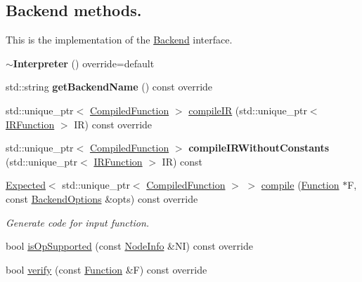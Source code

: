 \subsection*{Backend methods.}
\label{_amgrp74a5605ee0c2530d0af87631bd615b01}%
 This is the implementation of the \hyperlink{classglow_1_1_backend}{Backend} interface. \begin{DoxyCompactItemize}
\item 
\mbox{\label{classglow_1_1_interpreter_a411faff129fc4eb700f1dfd834839e11}} 
{\bfseries $\sim$\+Interpreter} () override=default
\item 
\mbox{\label{classglow_1_1_interpreter_a3232216f9576c8085d334fc356193184}} 
std\+::string {\bfseries get\+Backend\+Name} () const override
\item 
std\+::unique\+\_\+ptr$<$ \hyperlink{classglow_1_1_compiled_function}{Compiled\+Function} $>$ \hyperlink{classglow_1_1_interpreter_a24793ffaf0f6a80a2983dcb117719659}{compile\+IR} (std\+::unique\+\_\+ptr$<$ \hyperlink{classglow_1_1_i_r_function}{I\+R\+Function} $>$ IR) const override
\item 
\mbox{\label{classglow_1_1_interpreter_ade5bdc8e683c53c6a1cebf3959a673e3}} 
std\+::unique\+\_\+ptr$<$ \hyperlink{classglow_1_1_compiled_function}{Compiled\+Function} $>$ {\bfseries compile\+I\+R\+Without\+Constants} (std\+::unique\+\_\+ptr$<$ \hyperlink{classglow_1_1_i_r_function}{I\+R\+Function} $>$ IR) const
\item 
\hyperlink{classglow_1_1detail_1_1_glow_expected}{Expected}$<$ std\+::unique\+\_\+ptr$<$ \hyperlink{classglow_1_1_compiled_function}{Compiled\+Function} $>$ $>$ \hyperlink{classglow_1_1_interpreter_a1de9a9294a6ede268ca5b13f980be67e}{compile} (\hyperlink{classglow_1_1_function}{Function} $\ast$F, const \hyperlink{structglow_1_1_backend_options}{Backend\+Options} \&opts) const override
\begin{DoxyCompactList}\small\item\em Generate code for input function. \end{DoxyCompactList}\item 
bool \hyperlink{classglow_1_1_interpreter_adafc02e2ecf1481c5b08c2f5c909647e}{is\+Op\+Supported} (const \hyperlink{classglow_1_1_node_info}{Node\+Info} \&NI) const override
\item 
bool \hyperlink{classglow_1_1_interpreter_a9dd7a307318bd87414bac5d8cabf5a6f}{verify} (const \hyperlink{classglow_1_1_function}{Function} \&F) const override

\end{DoxyCompactItemize}

